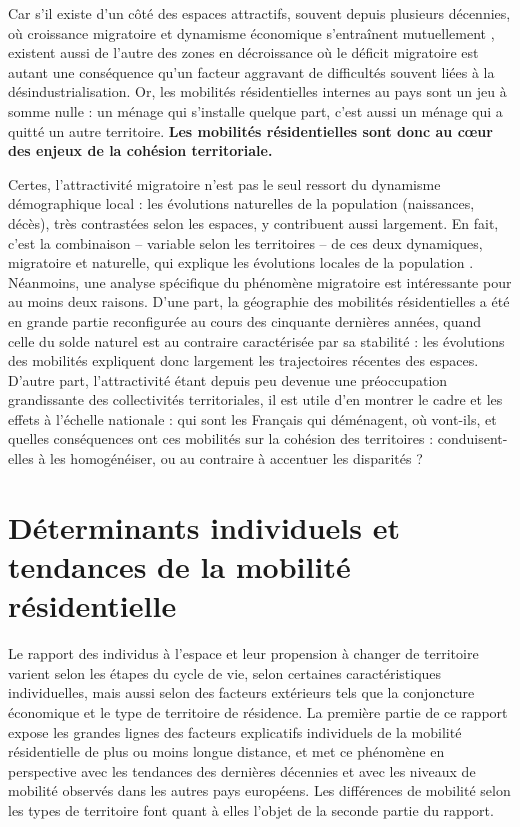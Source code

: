 \documentclass[]{book}
\begin{document}
Car s'il existe d'un côté des espaces attractifs, souvent depuis
plusieurs décennies, où croissance migratoire et dynamisme économique
s'entraînent mutuellement , existent aussi de l'autre des zones en
décroissance où le déficit migratoire est autant une conséquence qu'un
facteur aggravant de difficultés souvent liées à la
désindustrialisation. Or, les mobilités résidentielles internes au pays
sont un jeu à somme nulle : un ménage qui s'installe quelque part, c'est
aussi un ménage qui a quitté un autre territoire. \textbf{Les mobilités
résidentielles sont donc au cœur des enjeux de la cohésion
territoriale.}

Certes, l'attractivité migratoire n'est pas le seul ressort du dynamisme
démographique local : les évolutions naturelles de la population
(naissances, décès), très contrastées selon les espaces, y contribuent
aussi largement. En fait, c'est la combinaison -- variable selon les
territoires -- de ces deux dynamiques, migratoire et naturelle, qui
explique les évolutions locales de la population . Néanmoins, une
analyse spécifique du phénomène migratoire est intéressante pour au
moins deux raisons. D'une part, la géographie des mobilités
résidentielles a été en grande partie reconfigurée au cours des
cinquante dernières années, quand celle du solde naturel est au
contraire caractérisée par sa stabilité : les évolutions des mobilités
expliquent donc largement les trajectoires récentes des espaces. D'autre
part, l'attractivité étant depuis peu devenue une préoccupation
grandissante des collectivités territoriales, il est utile d'en montrer
le cadre et les effets à l'échelle nationale : qui sont les Français qui
déménagent, où vont-ils, et quelles conséquences ont ces mobilités sur
la cohésion des territoires : conduisent-elles à les homogénéiser, ou au
contraire à accentuer les disparités ?

\chapter{Déterminants individuels et tendances de la mobilité
résidentielle}\label{determinants-individuels-et-tendances-de-la-mobilite-residentielle}

Le rapport des individus à l'espace et leur propension à changer de
territoire varient selon les étapes du cycle de vie, selon certaines
caractéristiques individuelles, mais aussi selon des facteurs extérieurs
tels que la conjoncture économique et le type de territoire de
résidence. La première partie de ce rapport expose les grandes lignes
des facteurs explicatifs individuels de la mobilité résidentielle de
plus ou moins longue distance, et met ce phénomène en perspective avec
les tendances des dernières décennies et avec les niveaux de mobilité
observés dans les autres pays européens. Les différences de mobilité
selon les types de territoire font quant à elles l'objet de la seconde
partie du rapport.
\end{document}

